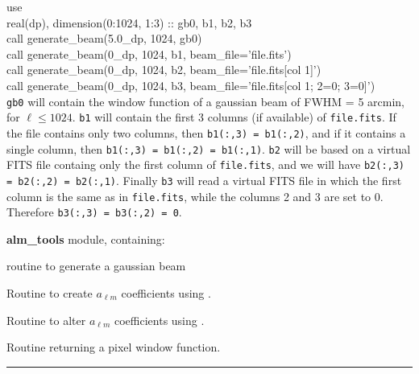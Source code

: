 
\begin{example}
{
use  \\
real(dp), dimension(0:1024, 1:3) :: gb0, b1, b2, b3\\
call generate\_beam(5.0\_dp, 1024, gb0)\\
call generate\_beam(0\_dp, 1024, b1, beam\_file='file.fits')\\
call generate\_beam(0\_dp, 1024, b2, beam\_file='file.fits[col 1]')\\
call generate\_beam(0\_dp, 1024, b3, beam\_file='file.fits[col 1; 2=0; 3=0]')\\
}
{%
{\tt gb0} will contain the window function of a gaussian beam of FWHM = 5 arcmin, for $\ell
\leq 1024$.
\newline
{\tt b1} will contain the first 3 columns (if available) of {\tt file.fits}. If
the file contains only two columns, then {\tt b1(:,3) = b1(:,2)}, and
if it contains a single column, then {\tt b1(:,3) = b1(:,2) = b1(:,1)}.
\newline
{\tt b2} will be
based on a virtual FITS file containg only the first column of {\tt file.fits},
and we will have {\tt b2(:,3) = b2(:,2) = b2(:,1)}. 
\newline
Finally {\tt b3} will read a
virtual FITS file in which the first column is the same as in {\tt file.fits},
while the columns 2 and 3 are set to 0. Therefore {\tt b3(:,3) = b3(:,2) = 0}.
\label{sub:ex:generate_beam}
}
\end{example}



\begin{modules}
  \begin{sulist}{} %
  \item[\textbf{alm\_tools}] module, containing:
	\item[\htmlref{gaussbeam}{sub:gaussbeam}] routine to generate a gaussian beam
  \end{sulist}
\end{modules}

\begin{related}
  \begin{sulist}{} %
  \item[\htmlref{create\_alm}{sub:create_alm}] Routine to create $a_{\ell m}$
  coefficients using \thedocid.
  \item[\htmlref{alter\_alm}{sub:alter_alm}] Routine to alter $a_{\ell m}$
  coefficients  using \thedocid.
  \item[\htmlref{pixel\_window}{sub:pixel_window}] Routine returning a pixel
  window function.
  \end{sulist}
\end{related}

\rule{\hsize}{2mm}

\newpage
